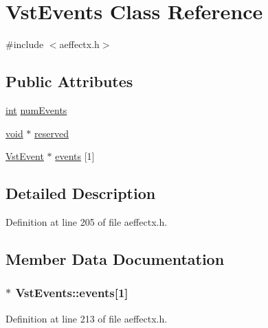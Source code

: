 \hypertarget{class_vst_events}{}\section{Vst\+Events Class Reference}
\label{class_vst_events}


{\ttfamily \#include $<$aeffectx.\+h$>$}

\subsection*{Public Attributes}
\begin{DoxyCompactItemize}
\item 
\hyperlink{xmltok_8h_a5a0d4a5641ce434f1d23533f2b2e6653}{int} \hyperlink{class_vst_events_a6ef57a656663db82f9e42565b4a1ef3c}{num\+Events}
\item 
\hyperlink{sound_8c_ae35f5844602719cf66324f4de2a658b3}{void} $\ast$ \hyperlink{class_vst_events_a9d3212cc080d0e21a9b4bc275f6c0f7f}{reserved}
\item 
\hyperlink{class_vst_event}{Vst\+Event} $\ast$ \hyperlink{class_vst_events_a5fc1a097316f4fbee837c12b991ed572}{events} \mbox{[}1\mbox{]}
\end{DoxyCompactItemize}


\subsection{Detailed Description}


Definition at line 205 of file aeffectx.\+h.



\subsection{Member Data Documentation}
\subsubsection[{\texorpdfstring{events}{events}}]{$\ast$ Vst\+Events\+::events\mbox{[}1\mbox{]}}\hypertarget{class_vst_events_a5fc1a097316f4fbee837c12b991ed572}{}\label{class_vst_events_a5fc1a097316f4fbee837c12b991ed572}


Definition at line 213 of file aeffectx.\+h.

